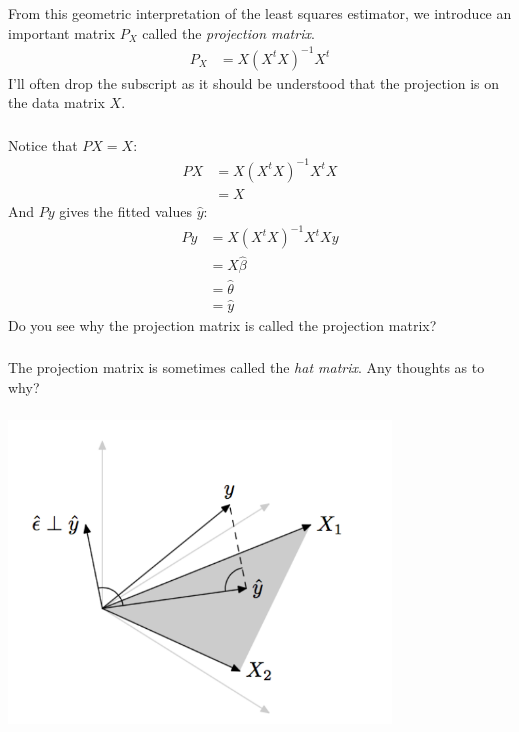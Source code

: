 \begin{frame}[fragile] \frametitle{}

From this geometric interpretation of the least squares estimator,
we introduce an important matrix $P_X$ called the {\it projection matrix}.
\begin{align*}
P_X &= X (X^t X)^{-1} X^t
\end{align*}
I'll often drop the subscript as it should be understood that the
projection is on the data matrix $X$.

\end{frame}

\begin{frame}[fragile] \frametitle{}

Notice that $PX=X$:
\begin{align*}
P X &= X (X^t X)^{-1} X^t X \\
&= X
\end{align*}
\pause And $Py$ gives the fitted values $\widehat{y}$:
\begin{align*}
P y &= X (X^t X)^{-1} X^t X y \\
&= X \widehat{\beta} \\
&= \widehat{\theta} \\
&= \widehat{y}
\end{align*}
Do you see why the projection matrix is called the projection
matrix? \pause

\end{frame}

\begin{frame}[fragile] \frametitle{}

The projection matrix is sometimes called the {\it hat matrix}.
Any thoughts as to why?

\end{frame}

\begin{frame}[fragile] \frametitle{}

\begin{center}
\includegraphics[width=4in]{img/olsGeom.pdf}
\end{center}

\end{frame}

